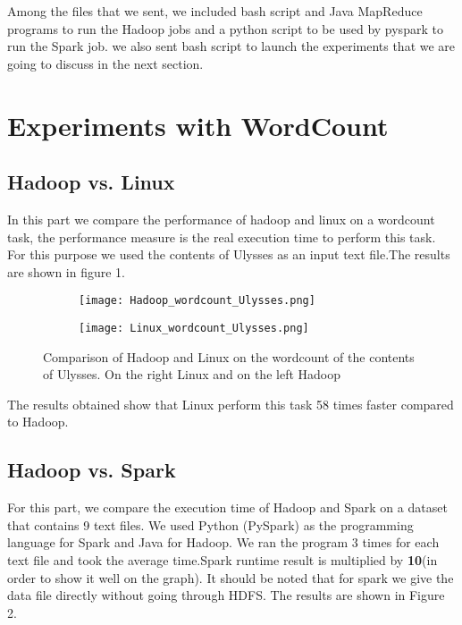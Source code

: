 \documentclass[12pt]{article}
\begin{document}
\noindent Among the files that we sent, we included bash script and Java MapReduce programs to run the Hadoop jobs and a python script to be used by pyspark to run the Spark job. we also sent bash script to launch the experiments that we are going to discuss in the next section.



\section{Experiments with WordCount}
\subsection{Hadoop vs. Linux}
In this part we compare the performance of hadoop and linux on a wordcount task, the performance measure is the real execution time to perform this task. For this purpose we used the contents of Ulysses as an input text file.The results are shown in figure 1.\newline
\begin{figure}[h]
    
     \begin{subfigure}[b]{0.41\textwidth}
         
         \texttt{[image: Hadoop\_wordcount\_Ulysses.png]}
         
     \end{subfigure}
     \hfill
     \begin{subfigure}[b]{0.41\textwidth}
         
         \texttt{[image: Linux\_wordcount\_Ulysses.png]}
         
     \end{subfigure}
     \hfill
        \centering
        \caption{Comparison of Hadoop and Linux on the wordcount of the contents of Ulysses. On the right Linux and on the left Hadoop}
        \label{fig:three graphs}
\end{figure}

\noindent The results obtained show that Linux perform this task 58 times faster compared to Hadoop.

\subsection{Hadoop vs. Spark}
For this part, we compare the execution time of Hadoop and Spark on a dataset that contains 9 text files. We used Python (PySpark) as the programming language for Spark and Java for Hadoop. We ran the program 3 times for each text file and took the average time.Spark runtime result is multiplied by \textbf{10}(in order to show it well on the graph). It should be noted that for spark we give the data file directly without going through HDFS. The results are shown in Figure 2.
\end{document}
